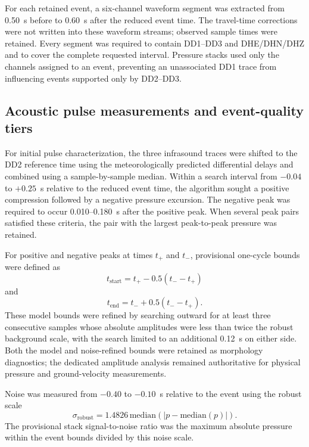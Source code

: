 \documentclass[]{seismica}
\begin{document}
For each retained event, a six-channel waveform segment was extracted from
0.50~s before to 0.60~s after the reduced event time. The travel-time
corrections were not written into these waveform streams; observed sample
times were retained. Every segment was required to contain DD1--DD3 and
DHE/DHN/DHZ and to cover the complete requested interval. Pressure stacks used
only the channels assigned to an event, preventing an unassociated DD1 trace
from influencing events supported only by DD2--DD3.

\subsection{Acoustic pulse measurements and event-quality tiers}

For initial pulse characterization, the three infrasound traces were shifted to the DD2 reference time using the meteorologically predicted differential delays and combined using a sample-by-sample median. Within a search interval from $-0.04$ to $+0.25$~s relative to the reduced event time, the algorithm sought a positive compression followed by a negative pressure excursion. The negative peak was required to occur 0.010--0.180~s after the positive peak. When several peak pairs satisfied these criteria, the pair with the largest peak-to-peak pressure was retained.

For positive and negative peaks at times $t_+$ and $t_-$, provisional one-cycle bounds were defined as
\begin{equation}
  t_{\mathrm{start}} = t_+ - 0.5(t_- - t_+)
  \label{eq:pulse_start}
\end{equation}
and
\begin{equation}
  t_{\mathrm{end}} = t_- + 0.5(t_- - t_+).
  \label{eq:pulse_end}
\end{equation}
These model bounds were refined by searching outward for at least three
consecutive samples whose absolute amplitudes were less than twice the robust
background scale, with the search limited to an additional 0.12~s on either
side. Both the model and noise-refined bounds were retained as morphology
diagnostics; the dedicated amplitude analysis remained authoritative for
physical pressure and ground-velocity measurements.

Noise was measured from $-0.40$ to $-0.10$~s relative to the event using the robust scale
\begin{equation}
  \sigma_{\mathrm{robust}} = 1.4826\,\mathrm{median}\left(\left|p-\mathrm{median}(p)\right|\right).
  \label{eq:robust_noise}
\end{equation}
The provisional stack signal-to-noise ratio was the maximum absolute pressure within the event bounds divided by this noise scale.
\end{document}
